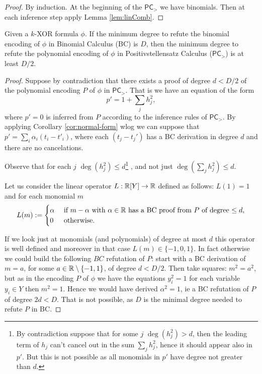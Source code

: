 \documentclass[a4paper,twoside,justified]{tufte-handout}
\begin{document}
\begin{proof}
By induction. At the beginning of the $\mathsf{PC}_>$ we have binomials. Then at each inference step apply Lemma \ref{lem:linComb}.
\end{proof}

\begin{theorem}\label{thm:BCtoPC<}
Given a $k$-XOR formula $\phi$. If the minimum degree to refute the binomial encoding of $\phi$ in Binomial Calculus (BC) is $D$, then the minimum degree to refute the polynomial encoding of $\phi$ in Positivstellensatz Calculus ($\mathsf{PC}_>$) is at least $D/2$.
\end{theorem}
\begin{proof}
Suppose by contradiction that there exists a proof of degree $d<D/2$ of the polynomial encoding $P$ of $\phi$ in $\mathsf{PC}_>$. That is we have an equation of the form 
\begin{equation}\label{eq:p'sum}
p'=1+\sum_j h_j^2,
\end{equation}
where $p'=0$ is inferred from $P$ according to the inference rules of $\mathsf{PC}_>$. By applying Corollary \ref{cor:normal-form} wlog we can suppose that $p'=\sum_i\alpha_i(t_i-t'_i)$, where each $(t_j-t_j')$ has a BC derivation in degree $d$ and there are no cancelations.

Observe that for each $j$ $\deg(h_j^2)\leq d$\footnote{
By contradiction suppose that for some $j$ $\deg(h_j^2)>d$, then the leading term of $h_j$ can't cancel out in the sum $\sum_j h_j^2$, hence it should appear also in $p'$. But this is not possible as all monomials in $p'$ have degree not greater than $d$.
}
, and not just $\deg(\sum_j h_j^2)\leq d$.


Let us consider the linear operator $L:\mathbb{R}[Y]\rightarrow \mathbb{R}$ defined as follows: $L(1)=1$ and for each monomial $m$
\begin{equation*}
L(m) := \begin{cases}
      \alpha & \text{ if $m-\alpha$ with $\alpha\in \mathbb{R}$ has a BC proof from $P$ of degree $\leq d$,} \\
      0 & \text{ otherwise.}
   \end{cases}
\end{equation*}

If we look just at monomials (and polynomials) of degree at most $d$ this operator is well defined and moreover in that case $L(m)\in \{-1,0,1\}$. 
In fact otherwise we could build the following $BC$ refutation of $P$: start with a BC derivation of $m=a$, for some $a\in \mathbb{R}\setminus\{-1,1\}$, of degree $d<D/2$.
 Then take squares: $m^2=a^2$, but as in the encoding $P$ of $\phi$ we have the equations $y_i^2=1$ for each variable $y_i\in Y$ then $m^2=1$. 
 Hence we would have derived $\alpha^2=1$, ie a BC refutation of $P$ of degree $2d< D$. That is not possible, as $D$ is the minimal degree needed to refute $P$ in BC.


\end{proof}
\end{document}
